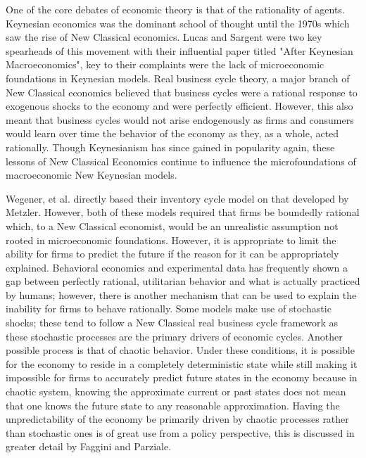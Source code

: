 One of the core debates of economic theory is that of the rationality of agents. Keynesian economics was the dominant school of thought until the 1970s which saw the rise of New Classical economics\autocite{Hartley2013}. Lucas and Sargent were two key spearheads of this movement with their influential paper titled "After Keynesian Macroeconomics"\autocite{Lucas1979}, key to their complaints were the lack of microeconomic foundations in Keynesian models. Real business cycle theory, a major branch of New Classical economics believed that business cycles were a rational response to exogenous shocks to the economy and were perfectly efficient. However, this also meant that business cycles would not arise endogenously as firms and consumers would learn over time the behavior of the economy as they, as a whole, acted rationally. Though Keynesianism has since gained in popularity again, these lessons of New Classical Economics continue to influence the microfoundations of macroeconomic New Keynesian models.

Wegener, et al. directly based their inventory cycle model on that developed by Metzler. However, both of these models required that firms be boundedly rational which, to a New Classical economist, would be an unrealistic assumption not rooted in microeconomic foundations. However, it is appropriate to limit the ability for firms to predict the future if the reason for it can be appropriately explained. Behavioral economics and experimental data has frequently shown a gap between perfectly rational, utilitarian behavior and what is actually practiced by humans\autocite{Smith2006}; however, there is another mechanism that can be used to explain the inability for firms to behave rationally. Some models make use of stochastic shocks; these tend to follow a New Classical real business cycle framework as these stochastic processes are the primary drivers of economic cycles. Another possible process is that of chaotic behavior. Under these conditions, it is possible for the economy to reside in a completely deterministic state while still making it impossible for firms to accurately predict future states in the economy because in chaotic system, knowing the approximate current or past states does not mean that one knows the future state to any reasonable approximation. Having the unpredictability of the economy be primarily driven by chaotic processes rather than stochastic ones is of great use from a policy perspective, this is discussed in greater detail by Faggini and Parziale\autocite{Faggini2012}. 

